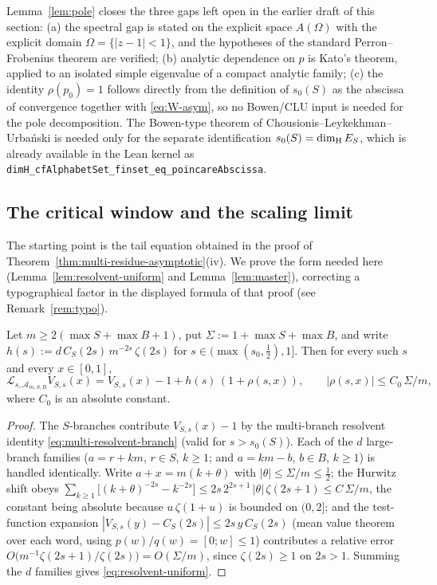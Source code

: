 \begin{remark}\label{rem:pole-status}
Lemma~\ref{lem:pole} closes the three gaps left open in the earlier draft of
this section: (a) the spectral gap is stated on the explicit space $A(\Omega)$
with the explicit domain $\Omega=\{|z-1|<1\}$, and the hypotheses of the
standard Perron--Frobenius theorem are verified; (b) analytic dependence on $p$
is Kato's theorem, applied to an isolated simple eigenvalue of a compact
analytic family; (c) the identity $\rho(p_0)=1$ follows directly from the
definition of $s_0(S)$ as the abscissa of convergence together with
\eqref{eq:W-asym}, so no Bowen/CLU input is needed for the pole decomposition.
The Bowen-type theorem of Chousionis--Leykekhman--Urba\'nski
\cite[Theorem~2.3]{CLU} is needed only for the separate identification
$s_0(S)=\dim_{\mathrm{H}} E_S$, which is already available in the Lean kernel as
\texttt{dimH\_cfAlphabetSet\_finset\_eq\_poincareAbscissa}.
\end{remark}

\subsection{The critical window and the scaling limit}

The starting point is the tail equation obtained in the proof of
Theorem~\ref{thm:multi-residue-asymptotic}(iv). We prove the form needed
here (Lemma~\ref{lem:resolvent-uniform} and Lemma~\ref{lem:master}),
correcting a typographical factor in the displayed formula of that proof
(see Remark~\ref{rem:typo}).

\begin{lemma}\label{lem:resolvent-uniform}
Let $m\ge 2(\max S+\max B+1)$, put $\Sigma:=1+\max S+\max B$, and write
$h(s):=d\,C_S(2s)\,m^{-2s}\,\zeta(2s)$ for $s\in(\max(s_0,\tfrac12),1]$.
Then for every such $s$ and every $x\in[0,1]$,
\begin{equation}\label{eq:resolvent-uniform}
\mathcal L_{s,\mathcal A_{m,S,B}}V_{S,s}(x)
=V_{S,s}(x)-1+h(s)\,(1+\rho(s,x)),\qquad |\rho(s,x)|\le C_0\,\Sigma/m,
\end{equation}
where $C_0$ is an absolute constant.
\end{lemma}

\begin{proof}
The $S$-branches contribute $V_{S,s}(x)-1$ by the multi-branch resolvent
identity \eqref{eq:multi-resolvent-branch} (valid for $s>s_0(S)$).  Each of the
$d$ large-branch families ($a=r+km$, $r\in S$, $k\ge1$; and $a=km-b$, $b\in B$,
$k\ge1$) is handled identically.  Write $a+x=m(k+\theta)$ with
$|\theta|\le\Sigma/m\le\tfrac12$; the Hurwitz shift obeys
$\sum_{k\ge1}\bigl[(k+\theta)^{-2s}-k^{-2s}\bigr]
\le 2s\,2^{2s+1}\,|\theta|\,\zeta(2s+1)\le C\,\Sigma/m$, the constant being
absolute because $u\,\zeta(1+u)$ is bounded on $(0,2]$; and the test-function
expansion $|V_{S,s}(y)-C_S(2s)|\le 2s\,y\,C_S(2s)$ (mean value theorem over
each word, using $p(w)/q(w)=[0;w]\le1$) contributes a relative error
$O\bigl(m^{-1}\zeta(2s+1)/\zeta(2s)\bigr)=O(\Sigma/m)$, since
$\zeta(2s)\ge1$ on $2s>1$.  Summing the $d$ families gives
\eqref{eq:resolvent-uniform}.
\end{proof}

